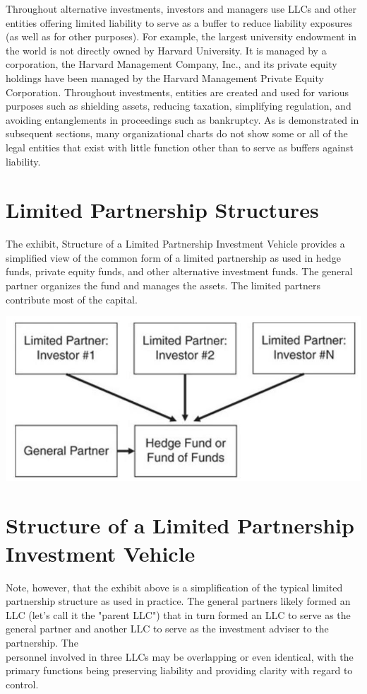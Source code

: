 \documentclass[11pt]{article}
\begin{document}
Throughout alternative investments, investors and managers use LLCs and other entities offering limited liability to serve as a buffer to reduce liability exposures (as well as for other purposes). For example, the largest university endowment in the world is not directly owned by Harvard University. It is managed by a corporation, the Harvard Management Company, Inc., and its private equity holdings have been managed by the Harvard Management Private Equity Corporation. Throughout investments, entities are created and used for various purposes such as shielding assets, reducing taxation, simplifying regulation, and avoiding entanglements in proceedings such as bankruptcy. As is demonstrated in subsequent sections, many organizational charts do not show some or all of the legal entities that exist with little function other than to serve as buffers against liability.

\section*{Limited Partnership Structures}
The exhibit, Structure of a Limited Partnership Investment Vehicle provides a simplified view of the common form of a limited partnership as used in hedge funds, private equity funds, and other alternative investment funds. The general partner organizes the fund and manages the assets. The limited partners contribute most of the capital.

\begin{center}
\includegraphics[max width=\textwidth]{2024_04_10_4befcf0ec10e9bee26edg-2}
\end{center}

\section*{Structure of a Limited Partnership Investment Vehicle}
Note, however, that the exhibit above is a simplification of the typical limited partnership structure as used in practice. The general partners likely formed an LLC (let's call it the "parent LLC") that in turn formed an LLC to serve as the general partner and another LLC to serve as the investment adviser to the partnership. The\\
personnel involved in three LLCs may be overlapping or even identical, with the primary functions being preserving liability and providing clarity with regard to control.
\end{document}
